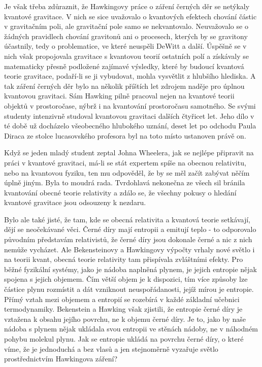   Je však třeba zdůraznit, že Hawkingovy práce o záření černých děr se netýkaly kvantové gravitace.
  V nich se sice uvažovalo o kvantových efektech chování částic v gravitačním poli, ale gravitační
  pole samo se nekvantovalo. Neuvažovalo se o žádných pravidlech chování gravitonů ani o procesech,
  kterých by se gravitony účastnily, tedy o problematice, ve které neuspěli DeWitt a další. Úspěšně
  se v nich však propojovala gravitace s kvantovou teorií ostatních polí a získávaly se matematicky
  přesně podložené zajímavé výsledky, které by budoucí kvantová teorie gravitace, podaří-li se ji
  vybudovat, mohla vysvětlit z hlubšího hlediska. A tak záření černých děr bylo na několik příštích
  let zdrojem naděje pro úplnou kvantovou gravitaci. Sám Hawking pilně pracoval nejen na kvantové
  teorii objektů v prostoročase, nýbrž i na kvantování prostoročasu samotného. Se svými studenty
  intenzivně studoval kvantovou gravitaci dalších čtyřicet let. Jeho dílo v té době už docházelo
  všeobecného hlubokého uznání, deset let po odchodu Paula Diraca ze stolce lucasovského profesora
  byl na toto místo ustanoven právě on. 
  
  Když se jeden mladý student zeptal Johna Wheelera, jak se nejlépe připravit na práci v kvantové
  gravitaci, má-li se stát expertem spíše na obecnou relativitu, nebo na kvantovou fyziku, ten mu
  odpověděl, že by se měl začít zabývat něčím úplně jiným. Byla to moudrá rada. Tvrdohlavá nekonečna
  ze všech sil bránila kvantování obecné teorie relativity a zdálo se, že všechny pokusy o hledání
  kvantové gravitace jsou odsouzeny k nezdaru. 
  
  Bylo ale také jisté, že tam, kde se obecná relativita a kvantová teorie setkávají, dějí se
  neočekávané věci. Černé díry mají entropii a emitují teplo - to odporovalo původním představám
  relativistů, že černé díry jsou dokonale černé a nic z nich nemůže vycházet. Ale Bekensteinovy a
  Hawkingovy výpočty vrhaly nové světlo i na teorii kvant, obecná teorie relativity tam přispívala
  zvláštními efekty. Pro běžné fyzikální systémy, jako je nádoba naplněná plynem, je jejich entropie
  nějak spojena s jejich objemem. Čím větší objem je k dispozici, tím více způsoby lze částice plynu
  rozmístit a dát vzniknout neuspořádanosti, jejíž mírou je entropie. Přímý vztah mezi objemem a
  entropií se rozebírá v každé základní učebnici termodynamiky. Bekenstein a Hawking však zjistili,
  že entropie černé díry je vztažena k obsahu jejího povrchu, ne k objemu černé díry. Je to, jako by
  naše nádoba s plynem nějak ukládala svou entropii ve stěnách nádoby, ne v náhodném pohybu molekul
  plynu. Jak se entropie ukládá na povrchu černé díry, o které víme, že je jednoduchá a bez vlasů a
  jen stejnoměrně vyzařuje světlo prostřednictvím Hawkingova záření? 
  
